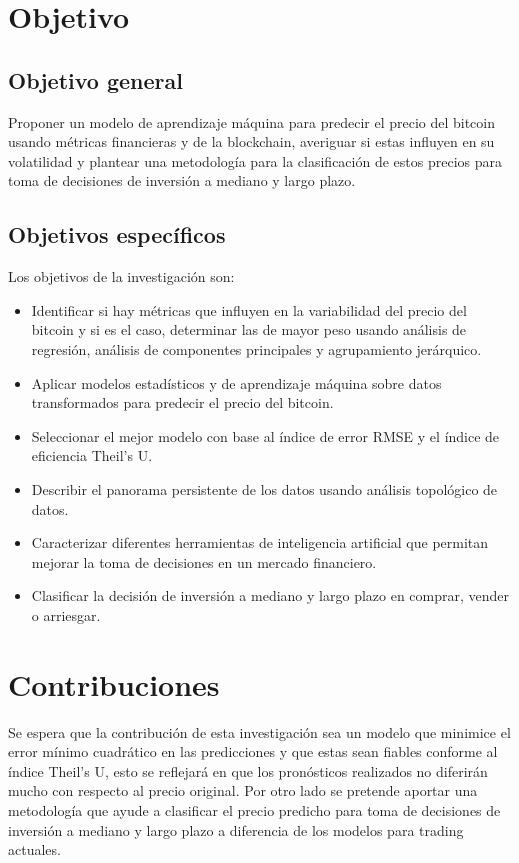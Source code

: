 \section{Objetivo}
\subsection{Objetivo general}
Proponer un modelo de aprendizaje máquina para predecir el precio del bitcoin usando métricas financieras y de la blockchain, averiguar si estas influyen en su volatilidad y %
plantear una metodología para la clasificación de estos precios para toma de decisiones de inversión a mediano y largo plazo.

\subsection{Objetivos específicos}
Los objetivos de la investigación son:
\begin{itemize}
	\item Identificar si hay métricas que influyen en la variabilidad del precio del bitcoin y si es el caso, determinar las de mayor peso usando análisis de regresión, análisis de componentes principales y agrupamiento jerárquico.
	\item Aplicar modelos estadísticos y de aprendizaje máquina sobre datos transformados para predecir el precio del bitcoin.
	\item Seleccionar el mejor modelo con base al índice de error RMSE y el índice de eficiencia Theil's U.
	\item Describir el panorama persistente de los datos usando análisis topológico de datos.
	\item Caracterizar diferentes herramientas de inteligencia artificial que permitan mejorar la toma de decisiones en un mercado financiero.
	\item Clasificar la decisión de inversión a mediano y largo plazo en comprar, vender o arriesgar.
\end{itemize}

\section{Contribuciones}
Se espera que la contribución de esta investigación sea un modelo que minimice el error mínimo cuadrático en las predicciones y que estas sean fiables conforme al índice Theil's U, esto se reflejará en que los pronósticos realizados no diferirán mucho con respecto al precio original.
Por otro lado se pretende aportar una metodología que ayude a clasificar el precio predicho para toma de decisiones de inversión
a mediano y largo plazo a diferencia de los modelos para trading actuales.
\vspace{-0.5cm}
